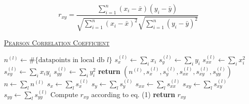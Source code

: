 \documentclass[12pt]{article}
\newcommand{\be}[1]{\begin{equation} \label{eq:#1}}
\newcommand{\ee}{\end{equation}}
\begin{document}
\be{pearsonr}
r_{xy} =\frac{\sum ^n _{i=1}(x_i - \bar{x})(y_i - \bar{y})}{\sqrt{\sum ^n _{i=1}(x_i - \bar{x})^2} \sqrt{\sum ^n _{i=1}(y_i - \bar{y})^2}}
\ee


\begin{algorithm}

        \caption{\underline{\textsc{Pearson Correlation Coefficient}}}
        \label{pearson}
        \begin{algorithmic}[1] %
                 
                        \State $n^{(l)} \gets \# \{\text{datapoints in local db } l\}$
                        \State $s_x^{(l)} \gets \sum_i x_i$
                        \State $s_y^{(l)} \gets \sum_i y_i$
                        \State $s_{xx}^{(l)} \gets \sum_i x_i^2$
                        \State $s_{xy}^{(l)} \gets \sum_i x_i y_i$
                        \State $s_{yy}^{(l)} \gets \sum_i y_i^2$
                        \State \textbf{return} $(n^{(l)}, s_x^{(l)}, s_y^{(l)}, s_{xx}^{(l)}, s_{xy}^{(l)}, s_{yy}^{(l)} )$ \EndProcedure
                        \State $n \gets \sum_l n^{(l)}$
                        \State $s_x \gets \sum_l s_x^{(l)}$
                        \State $s_y \gets \sum_l s_y^{(l)}$
                        \State $s_{xx} \gets \sum_l s_{xx}^{(l)}$
                        \State $s_{xy} \gets \sum_l s_{xy}^{(l)}$
                        \State $s_{yy} \gets \sum_l s_{yy}^{(l)}$
                        \State Compute $r_{xy}$ according to eq. (1)
                        \State \textbf{return} $r_{xy}$
                        \EndProcedure
        \end{algorithmic}

\end{algorithm}
\end{document}
